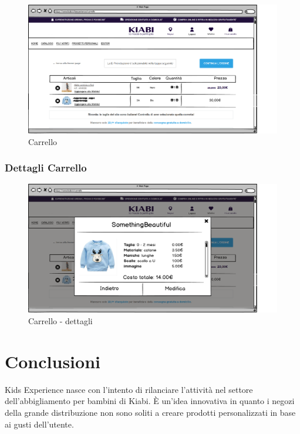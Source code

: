 \documentclass[12pt,italian,]{report}
\begin{document}
\begin{figure}[h]
\centering
\includegraphics{../../balsamiq/balsamiq_finale/Carrello.png}
\caption{Carrello}
\label{carrello}
\end{figure}

\newpage
\subsubsection{Dettagli Carrello} 

\begin{figure}[h]
\centering
\includegraphics{../../balsamiq/balsamiq_finale/Carrellodettagli.png}
\caption{Carrello - dettagli}
\label{carrello_dett}
\end{figure}


\newpage
\section{Conclusioni}

Kids Experience nasce con l'intento di rilanciare l'attività nel settore dell'abbigliamento per bambini di Kiabi. 
È un'idea innovativa in quanto i negozi della grande distribuzione non sono soliti a creare prodotti personalizzati in base ai gusti dell'utente. 
\end{document}
